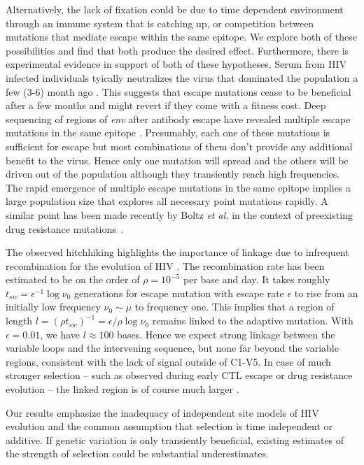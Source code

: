 \documentclass[rmp, twocolumn]{revtex4}
\newcommand{\env}{\textit{env}}
\begin{document}
Alternatively, the lack of fixation could be due to time dependent environment
through an immune system that is catching up, or competition between mutations
that mediate escape within the same epitope. We explore both of these
possibilities and find that both produce the desired effect. Furthermore, there
is experimental evidence in support of both of these hypotheses. Serum from HIV
infected individuals tyically neutralizes the virus that dominated the
population a few (3-6) month ago \citep{richman_rapid_2003}. This suggests that
escape mutations cease to be beneficial after a few months and might revert if
they come with a fitness cost. Deep sequencing of regions of \env{} after
antibody escape have revealed multiple escape mutations in the same epitope
\citep{moore_limited_2009, bar_early_2012}. Presumably, each one of these
mutations is sufficient for escape but most combinations of them don't provide
any additional benefit to the virus. Hence only one mutation will spread and the
others will be driven out of the population although they transiently reach high
frequencies. The rapid emergence of multiple escape mutations in the same
epitope implies a large population size that explores all necessary point
mutations rapidly. A similar point has been made recently by Boltz {\it et al.}
in the context of preexisting drug resistance
mutations~\citep{boltz_ultrasensitive_2012}. 

The observed hitchhiking highlights the importance of linkage due to infrequent
recombination for the evolution of HIV
\citep{neher_recombination_2010,batorsky_estimate_2011,
josefsson_majority_2011}. The recombination rate has been estimated to be on the
order of $\rho = 10^{-5}$ per base and day. It takes roughly $t_{sw} =
\epsilon^{-1} \log \nu_0$ generations for escape mutation with escape rate
$\epsilon$ to rise from an initially low frequency $\nu_0\sim \mu$ to frequency
one. This implies that a region of length $l = (\rho t_{sw})^{-1} = \epsilon /
\rho \log \nu_0$ remains linked to the adaptive mutation. With $\epsilon=0.01$,
we have $l\approx 100$ bases. Hence we expect strong linkage between the
variable loops and the intervening sequence, but none far beyond the variable
regions, consistent with the lack of signal outside of C1-V5. In case of much
stronger selection -- such as observed during early CTL escape or drug
resistance evolution -- the linked  region is of course much larger
\citep{nijhuis_stochastic_1998}.

Our results emphasize the inadequacy of independent site models of HIV evolution
and the common assumption that selection is time independent or additive. If
genetic variation is only transiently beneficial, existing estimates of the
strength of selection \citep{neher_rate_2010,batorsky_estimate_2011} could be
substantial underestimates.
\end{document}
